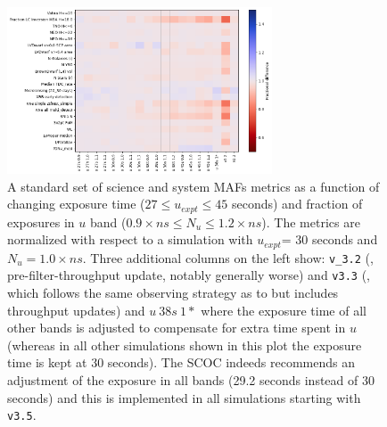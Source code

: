 \begin{figure}
\centering

\includegraphics[width=0.7\textwidth]{figures/u_band_scoc_heatmap.png}
\caption{ A standard set of science and system MAFs metrics as a function of changing exposure time ($27\leq u_{expt}\leq 45$ seconds) and fraction of exposures in $u$ band ($0.9\times ns\leq N_u \leq1.2\times ns$). The metrics are normalized with respect to a simulation with $u_{expt}$= 30 seconds and $N_u = 1.0\times ns$. Three additional columns on the left show: \texttt{v\_3.2} (, pre-filter-throughput update, notably generally worse) and \texttt{v3.3} (, which follows the same observing strategy as to  but includes throughput updates) and $u~38s~1*$ where the exposure time of all other bands is adjusted to compensate for extra time spent in $u$ (whereas in all other simulations shown in this plot the exposure time is kept at 30 seconds). The SCOC indeeds recommends an adjustment of the exposure in all bands (29.2 seconds instead of 30 seconds) and this is implemented in all simulations starting with \texttt{v3.5}.}

\end{figure}
\FloatBarrier

